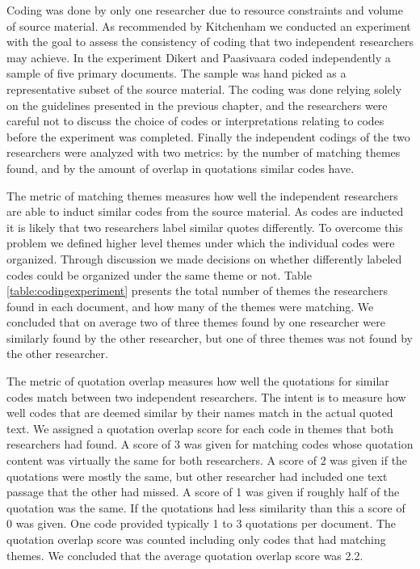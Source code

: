 \documentclass[preprint,authoryear,12pt]{elsarticle}
\begin{document}
Coding was done by only one researcher due to resource constraints and volume of
source material. As recommended by Kitchenham \cite{Kitchenham2007} we conducted
an experiment with the goal to assess the consistency of coding that two
independent researchers may achieve.
In the experiment Dikert and Paasivaara coded independently a sample of five
primary documents. The sample was hand picked as a representative subset of the
source material. The coding was done relying solely on the guidelines presented
in the previous chapter, and the researchers were careful not to discuss the
choice of codes or interpretations relating to codes before the experiment was
completed. Finally the independent codings of the two researchers were analyzed
with two metrics: by the number of matching themes found, and by the amount of
overlap in quotations similar codes have.

The metric of matching themes measures how well the independent researchers are
able to induct similar codes from the source material. As codes are inducted it
is likely that two researchers label similar quotes differently. To overcome
this problem we defined higher level themes under which the individual codes
were organized. Through discussion we made decisions on whether differently
labeled codes could be organized under the same theme or not. Table
\ref{table:codingexperiment} presents the total number of themes the researchers
found in each document, and how many of the themes were matching. We concluded
that on average two of three themes found by one researcher were similarly found
by the other researcher, but one of three themes was not found by the other
researcher.

The metric of quotation overlap measures how well the quotations for similar
codes match between two independent researchers. The intent is to measure how
well codes that are deemed similar by their names match in the actual quoted
text. We assigned a quotation overlap score for each code in themes that both
researchers had found. A score of 3 was given for matching codes whose quotation
content was virtually the same for both researchers. A score of 2 was given if
the quotations were mostly the same, but other researcher had included one text
passage that the other had missed. A score of 1 was given if roughly half of the
quotation was the same. If the quotations had less similarity than this a score
of 0 was given. One code provided typically 1 to 3 quotations per document. The
quotation overlap score was counted including only codes that had matching
themes. We concluded that the average quotation overlap score was 2.2.
\end{document}
